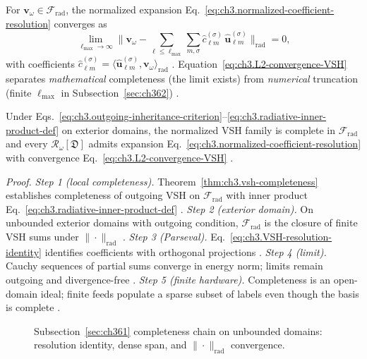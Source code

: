For \(\mathbf{v}_\omega\in\mathcal{F}_{\mathrm{rad}}\), the normalized expansion
Eq.~\eqref{eq:ch3.normalized-coefficient-resolution} converges as
\begin{equation}
\label{eq:ch3.L2-convergence-VSH}
\lim_{\ell_{\max}\to\infty}
\Big\|
\mathbf{v}_\omega
-
\sum_{\ell\le\ell_{\max}}\sum_{m,\sigma}
\widehat{c}_{\ell m}^{(\sigma)}\,\widehat{\mathbf{u}}_{\ell m}^{(\sigma)}
\Big\|_{\mathrm{rad}}
=
0,
\end{equation}
with coefficients \(\widehat{c}_{\ell m}^{(\sigma)}=\langle\widehat{\mathbf{u}}_{\ell m}^{(\sigma)},\mathbf{v}_\omega\rangle_{\mathrm{rad}}\)
\cite{hansen1988}. Equation~\eqref{eq:ch3.L2-convergence-VSH} separates \emph{mathematical}
completeness (the limit exists) from \emph{numerical} truncation (finite \(\ell_{\max}\) in Subsection~\ref{sec:ch362})
\cite{harrington2001}.
\begin{theorem}
\label{thm:ch3.unbounded-domain-completeness}
Under Eqs.~\eqref{eq:ch3.outgoing-inheritance-criterion}--\eqref{eq:ch3.radiative-inner-product-def} on exterior
domains, the normalized VSH family is complete in \(\mathcal{F}_{\mathrm{rad}}\) and every
\(\mathcal{R}_\omega[\mathfrak{D}]\) admits expansion Eq.~\eqref{eq:ch3.normalized-coefficient-resolution} with
convergence Eq.~\eqref{eq:ch3.L2-convergence-VSH} \cite{hansen1988}.
\end{theorem}
\noindent\textit{Proof.}
\emph{Step 1 (local completeness).} Theorem~\ref{thm:ch3.vsh-completeness} establishes completeness of outgoing VSH on \(\mathcal{F}_{\mathrm{rad}}\) with inner product Eq.~\eqref{eq:ch3.radiative-inner-product-def} .
\emph{Step 2 (exterior domain).} On unbounded exterior domains with outgoing condition, \(\mathcal{F}_{\mathrm{rad}}\) is the closure of finite VSH sums under \(\|\cdot\|_{\mathrm{rad}}\) .
\emph{Step 3 (Parseval).} Eq.~\eqref{eq:ch3.VSH-resolution-identity} identifies coefficients with orthogonal projections .
\emph{Step 4 (limit).} Cauchy sequences of partial sums converge in energy norm; limits remain outgoing and divergence-free .
\emph{Step 5 (finite hardware).} Completeness is an open-domain ideal; finite feeds populate a sparse subset of labels even though the basis is complete .
\begin{figure}[t]
\centering
{}
\caption{Subsection~\ref{sec:ch361} completeness chain on unbounded domains: resolution identity, dense span, and
\(\|\cdot\|_{\mathrm{rad}}\) convergence.}
\label{fig:ch3.361-completeness-chain}
\end{figure}
